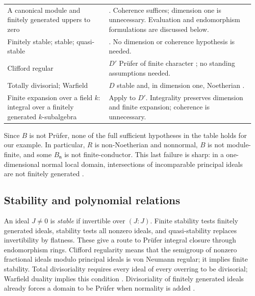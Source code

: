 \begin{longtable}{@{}>{\raggedright\arraybackslash}p{}
                    >{\raggedright\arraybackslash}p{}@{}}
\addlinespace
A canonical module and finitely generated uppers to zero
& \cite[Prop.~4.14]{GlazVasconcelos1984}.
Coherence suffices; dimension one is unnecessary. Evaluation and
endomorphism formulations are discussed below.\\
\addlinespace
Finitely stable; stable; quasi-stable
& \cite[Prop.~3.4, Cor.~3.5]{PicozzaTartarone2010}.
No dimension or coherence hypothesis is needed.\\
\addlinespace
Clifford regular
& $D'$ Pr\"ufer of finite character
\cite[Prop.~3.4, Cor.~4.8]{Bazzoni2011}; no standing assumptions needed.\\
\addlinespace
Totally divisorial; Warfield
& $D$ stable and, in dimension one, Noetherian
\cite[pp.~263--264, Lemmas~3.2--3.3]{Olberding2001}.\\
\addlinespace
Finite expansion over a field $k$: integral over a finitely generated
$k$-subalgebra
& Apply \cite[Thm.~3.5]{Steiner2026} to $D'$.
Integrality preserves dimension and finite expansion; coherence is
unnecessary.\\
\end{longtable}
\endgroup

Since $B$ is not Pr\"ufer, none of the full sufficient hypotheses in
the table holds for our example. In particular, $R$ is non-Noetherian
and nonnormal, $B$ is not module-finite, and some $B_{\mathfrak n}$ is
not finite-conductor. This last failure is sharp: in a one-dimensional
normal local domain, intersections of incomparable principal ideals
are not finitely generated \cite[Rem.~2.2]{GuerrieriLoper2021}.

\subsection{Stability and polynomial relations}
An ideal $J\ne0$ is \emph{stable} if invertible over $(J:J)$.
Finite stability tests finitely generated ideals, stability tests all
nonzero ideals, and quasi-stability replaces invertibility by flatness.
These give a route to Pr\"ufer integral closure through endomorphism rings.
Clifford regularity means that the semigroup of nonzero fractional ideals
modulo principal ideals is von Neumann regular; it implies finite
stability. Total divisoriality requires every ideal of every overring to
be divisorial; Warfield duality implies this condition
\cite{Bazzoni2011,Olberding2001}. Divisoriality of finitely generated
ideals already forces a domain to be Pr\"ufer when normality is added
\cite[Cor.~3.2]{TamekkanteAssaadBouba2019}.

